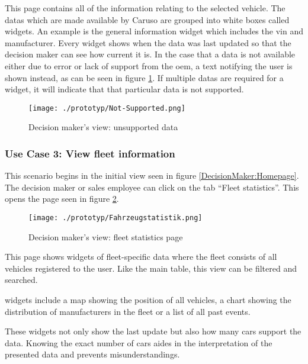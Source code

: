 This page contains all of the information relating to the selected vehicle. The \glspl{data} which are made available by Caruso are grouped into white boxes called \glspl{widget}. An example is the general information \gls{widget} which includes the \gls{vin} and manufacturer. Every \gls{widget} shows when the data was last updated so that the decision maker can see how current it is. In the case that a \gls{data} is not available either due to error or lack of support from the \gls{oem}, a text notifying the user is shown instead, as can be seen in figure \ref{DecisionMaker:NotSupported}. If multiple \glspl{data} are required for a \gls{widget}, it will indicate that that particular \gls{data} is not supported.


\begin{figure}[ht]
  \centering
  \texttt{[image: ./prototyp/Not-Supported.png]}
  \caption{Decision maker's view: unsupported \gls{data}}
  \label{DecisionMaker:NotSupported}
\end{figure}

\subsubsection{Use Case 3: View fleet information}
This scenario begins in the initial view seen in figure \ref{DecisionMaker:Homepage}. The decision maker or sales employee can click on the tab \enquote{Fleet statistics}. This opens the page seen in figure \ref{DecisionMaker:Fahrzeugstatistik}.
\begin{figure}[H]
  \centering
  \texttt{[image: ./prototyp/Fahrzeugstatistik.png]}
  \caption{Decision maker's view: fleet statistics page}
  \label{DecisionMaker:Fahrzeugstatistik}
\end{figure}

This page shows \glspl{widget} of fleet-specific data where the fleet consists of all vehicles registered to the user. Like the main table, this view can be filtered and searched.

\Glspl{widget} include a map showing the position of all vehicles, a chart showing the distribution of manufacturers in the fleet or a list of all past events.

These \glspl{widget} not only show the last update but also how many cars support the \gls{data}. Knowing the exact number of cars aides in the interpretation of the presented data and prevents misunderstandings.

\newpage


